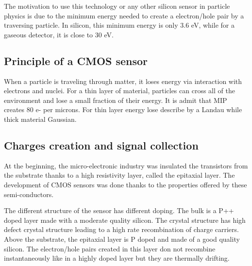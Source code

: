  The motivation to use this technology or any other silicon sensor in particle physics is due to the minimum energy needed to create a electron/hole pair by a traversing particle.
  In silicon, this minimum energy is only 3.6 eV, while for a gaseous detector, it is close to 30 eV.

  
    \subsection{Principle of a CMOS sensor}

    When a particle is traveling through matter, it loses energy via interaction with electrons and nuclei.
    For a thin layer of material, particles can cross all of the environment and lose a small fraction of their energy.
    It is admit that \gls{MIP} creates 80 e- per microns. 
    For thin layer energy lose describe by a Landau while thick material Gaussian.

    \subsection{Charges creation and signal collection}   

    At the beginning, the micro-electronic industry was insulated the transistors from the substrate thanks to a high resistivity layer, called the epitaxial layer.
    The development of \gls{CMOS} sensors was done thanks to the properties offered by these semi-conductors.

    The different structure of the sensor has different doping.
    The bulk is a P++ doped layer made with a moderate quality silicon.
    The crystal structure has high defect crystal structure leading to a high rate recombination of charge carriers.
    Above the substrate, the epitaxial layer is P doped and made of a good quality silicon.
    The electron/hole pairs created in this layer don not recombine instantaneously like in a highly doped layer but they are thermally drifting. 
    

